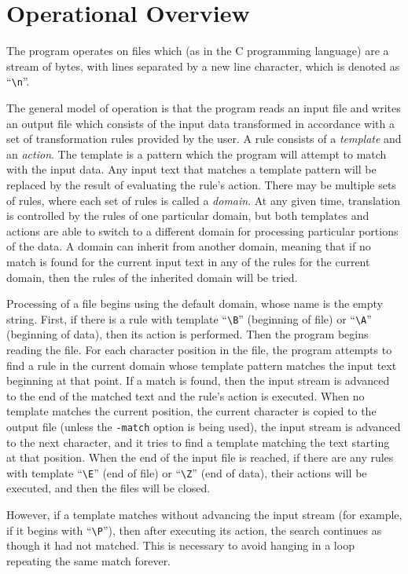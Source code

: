

\section{Operational Overview}

The program operates on files which (as in the C programming language) are
a stream of bytes, with lines separated by a new line character, which is
denoted as ``\verb|\n|''.

The general model of operation is that the program reads an input file
and writes an output file which consists of the input data transformed in
accordance with a set of transformation rules provided by the user.
A rule consists of a {\em template} and an {\em action}.  The template
is a pattern which the program will attempt to match with the input data.
Any input text that matches a template pattern will be replaced by the
result of evaluating the rule's action.  There may be multiple sets of
rules, where each set of rules is called a {\em domain}.  At any given
time, translation is controlled by the rules of one particular domain, but
both templates and actions are able to switch to a different domain for
processing particular portions of the data.  A domain can inherit from
another domain, meaning that if no match is found for the current input
text in any of the rules for the current domain, then the rules of the
inherited domain will be tried.

Processing of a file begins using the default domain, whose name is the
empty string.  First, if there is a rule with template ``\verb/\B/''
(beginning of file) or ``\verb/\A/'' (beginning of data), then its action
is performed.  Then the program begins reading the file.  For each
character position in the file, the program attempts to find a rule in
the current domain whose template pattern matches the input text
beginning at that point.  If a match is found, then the input stream is
advanced to the end of the matched text and the rule's action is
executed.  When no template matches the current position, the current
character is copied to the output file (unless the \verb/-match/ option
is being used), the input stream is advanced to the next character, and
it tries to find a template matching the text starting at that position.
When the end of the input file is reached, if there are any rules with
template ``\verb/\E/'' (end of file) or ``\verb/\Z/'' (end of data),
their actions will be executed, and then the files will be closed.

However, if a template matches without advancing the input stream (for
example, if it begins with ``\verb/\P/''), then after executing its action,
the search continues as though it had not matched.  This is necessary to
avoid hanging in a loop repeating the same match forever.

